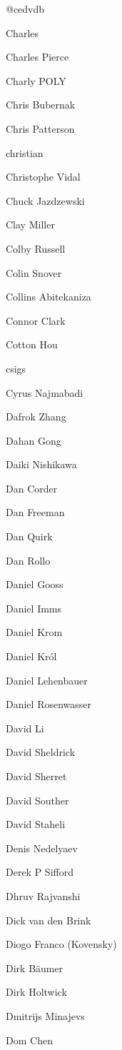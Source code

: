 \begin{DoxyItemize}
\item @cedvdb
\item Charles
\item Charles Pierce
\item Charly P\+O\+LY
\item Chris Bubernak
\item Chris Patterson
\item christian
\item Christophe Vidal
\item Chuck Jazdzewski
\item Clay Miller
\item Colby Russell
\item Colin Snover
\item Collins Abitekaniza
\item Connor Clark
\item Cotton Hou
\item csigs
\item Cyrus Najmabadi
\item Dafrok Zhang
\item Dahan Gong
\item Daiki Nishikawa
\item Dan Corder
\item Dan Freeman
\item Dan Quirk
\item Dan Rollo
\item Daniel Gooss
\item Daniel Imms
\item Daniel Krom
\item Daniel Król
\item Daniel Lehenbauer
\item Daniel Rosenwasser
\item David Li
\item David Sheldrick
\item David Sherret
\item David Souther
\item David Staheli
\item Denis Nedelyaev
\item Derek P Sifford
\item Dhruv Rajvanshi
\item Dick van den Brink
\item Diogo Franco (Kovensky)
\item Dirk Bäumer
\item Dirk Holtwick
\item Dmitrijs Minajevs
\item Dom Chen

\end{DoxyItemize}
